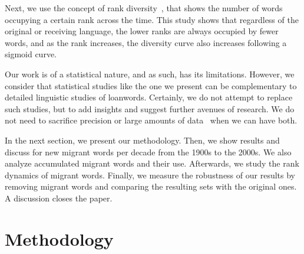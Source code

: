 \documentclass[10pt,letterpaper]{article} %
\begin{document}
Next, we use the concept of rank diversity~\cite{iplosone},  that shows the number of words
occupying a certain rank across the time. This study shows that  regardless of
the original or receiving language,  the lower ranks are always occupied by
fewer words, and as the rank increases, the diversity curve also increases following a sigmoid curve. 

Our work is of a statistical nature, and as such, has its limitations. However, we consider that statistical studies like the one we present can be complementary to detailed linguistic studies of loanwords. Certainly, we do not attempt to replace such studies, but to add insights and suggest further avenues of research. We do not need to sacrifice precision or large amounts of data~\cite{Harford2014} when we can have both.

In the next section, we present our methodology. Then, we show results and discuss for new migrant words per decade from the 1900s to the 2000s. We also analyze accumulated migrant words and their use. Afterwards, we study the rank dynamics of migrant words. Finally, we measure the robustness of our results by removing migrant words and comparing the resulting sets with the original ones. A discussion closes the paper.



\section*{Methodology} %
\end{document}
